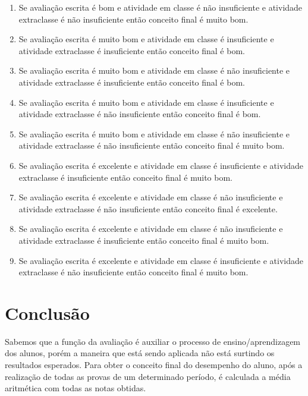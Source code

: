 \documentclass{article}
\begin{document}
\begin{enumerate}
	\item Se avaliação escrita é bom e atividade em classe é não
		insuficiente e atividade extraclasse é não insuficiente
		então conceito final é muito bom.

	\item Se avaliação escrita é muito bom e atividade em classe
		é insuficiente e atividade extraclasse é insuficiente
		então conceito final é bom.

	\item Se avaliação escrita é muito bom e atividade em classe
		é não insuficiente e atividade extraclasse é
		insuficiente então conceito final é bom.

	\item Se avaliação escrita é muito bom e atividade em classe
		é insuficiente e atividade extraclasse é não
		insuficiente então conceito final é bom.


	\item Se avaliação escrita é muito bom e atividade em classe
		é não insuficiente e atividade extraclasse é não
		insuficiente então conceito final é muito bom.

	\item Se avaliação escrita é excelente e atividade em classe
		é insuficiente e atividade extraclasse é insuficiente
		então conceito final é muito bom.

	\item Se avaliação escrita é excelente e atividade em classe
		é não insuficiente e atividade extraclasse é não
		insuficiente então conceito final é excelente.

	\item Se avaliação escrita é excelente e atividade em classe
		é não insuficiente e atividade extraclasse é
		insuficiente então conceito final é muito bom.

	\item Se avaliação escrita é excelente e atividade em classe
		é insuficiente e atividade extraclasse é não
		insuficiente então conceito final é muito bom.

\end{enumerate}



\section{Conclusão}
Sabemos que a função da avaliação é auxiliar o processo de
ensino/aprendizagem dos alunos, porém a maneira que está sendo
aplicada não está surtindo os resultados esperados. Para obter
o conceito final do desempenho do aluno, após a realização
de todas as provas de um determinado período, é calculada a
média aritmética com todas as notas obtidas.
\end{document}
